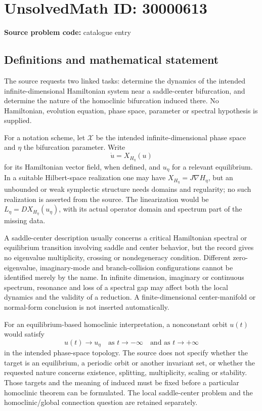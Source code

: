 \documentclass[11pt]{article}
\begin{document}
\section*{UnsolvedMath ID: 30000613}
\textbf{Source problem code:} catalogue entry
\subsection{Definitions and mathematical statement}
The source requests two linked tasks: determine the dynamics of the intended infinite-dimensional Hamiltonian system near a saddle-center bifurcation, and determine the nature of the homoclinic bifurcation induced there. No Hamiltonian, evolution equation, phase space, parameter or spectral hypothesis is supplied.

For a notation scheme, let \(\mathcal X\) be the intended infinite-dimensional phase space and \(\eta\) the bifurcation parameter. Write
\[
 \dot u=X_{H_\eta}(u)
\]
for its Hamiltonian vector field, when defined, and \(u_\eta\) for a relevant equilibrium. In a suitable Hilbert-space realization one may have \(X_{H_\eta}=J\nabla H_\eta\), but an unbounded or weak symplectic structure needs domains and regularity; no such realization is asserted from the source. The linearization would be \(L_\eta=D X_{H_\eta}(u_\eta)\), with its actual operator domain and spectrum part of the missing data.

A saddle-center description usually concerns a critical Hamiltonian spectral or equilibrium transition involving saddle and center behavior, but the record gives no eigenvalue multiplicity, crossing or nondegeneracy condition. Different zero-eigenvalue, imaginary-mode and branch-collision configurations cannot be identified merely by the name. In infinite dimension, imaginary or continuous spectrum, resonance and loss of a spectral gap may affect both the local dynamics and the validity of a reduction. A finite-dimensional center-manifold or normal-form conclusion is not inserted automatically.

For an equilibrium-based homoclinic interpretation, a nonconstant orbit \(u(t)\) would satisfy
\[
 u(t)\longrightarrow u_\eta\quad\text{as }t\to-\infty
 \quad\text{and as }t\to+\infty
\]
in the intended phase-space topology. The source does not specify whether the target is an equilibrium, a periodic orbit or another invariant set, or whether the requested nature concerns existence, splitting, multiplicity, scaling or stability. Those targets and the meaning of induced must be fixed before a particular homoclinic theorem can be formulated. The local saddle-center problem and the homoclinic/global connection question are retained separately.
\end{document}
